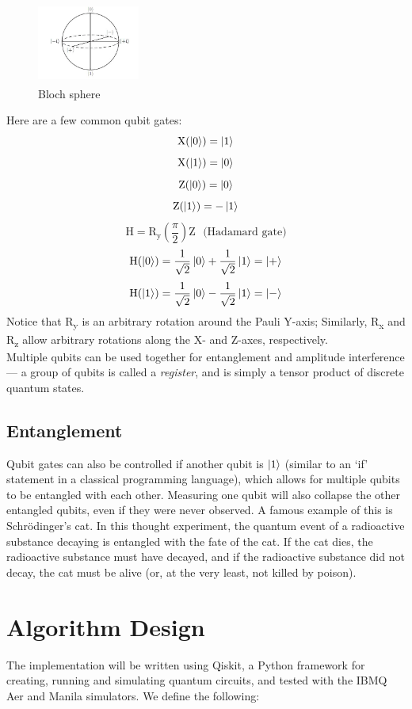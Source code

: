 \documentclass[12pt]{article}
\begin{document}
\begin{figure}[H]
    \centering
    \capstart
    \includegraphics[width=0.3\textwidth]{images/bloch_sphere.png}
    \caption{Bloch sphere\textsuperscript{\cite{wikipedia_2021}}}
    \label{fig:bsphere}
\end{figure}

\noindent Here are a few common qubit gates:
$$ \text{X}(\ket{0}) = \ket{1} $$
$$ \text{X}(\ket{1}) = \ket{0} $$
$$ \text{Z}(\ket{0}) = \ket{0} $$
$$ \text{Z}(\ket{1}) = -\ket{1} $$
$$ \text{H} = \text{R}_{\text{y}} \left(\frac{\pi}{2}\right) \text{Z} \ \ \ \text{(Hadamard gate)}$$
$$ \text{H}(\ket{0}) = \frac{1}{\sqrt{2}} \ket{0} + \frac{1}{\sqrt{2}} \ket{1} = \ket{+} $$
$$ \text{H}(\ket{1}) = \frac{1}{\sqrt{2}} \ket{0} - \frac{1}{\sqrt{2}} \ket{1} = \ket{-} $$
Notice that R\textsubscript{y} is an arbitrary rotation around the Pauli Y-axis; Similarly, R\textsubscript{x} and R\textsubscript{z} allow arbitrary rotations along the X- and Z-axes, respectively.\\
Multiple qubits can be used together for entanglement and amplitude interference --- a group of qubits is called a \textit{register}, and is simply a tensor product of discrete quantum states.

\subsection{Entanglement}
Qubit gates can also be controlled if another qubit is $\ket{1}$ (similar to an `if' statement in a classical programming language), which allows for multiple qubits to be entangled with each other. Measuring one qubit will also collapse the other entangled qubits, even if they were never observed. A famous example of this is Schr\"odinger's cat. In this thought experiment, the quantum event of a radioactive substance decaying is entangled with the fate of the cat. If the cat dies, the radioactive substance must have decayed, and if the radioactive substance did not decay, the cat must be alive (or, at the very least, not killed by poison).

\section{Algorithm Design}
The implementation will be written using Qiskit, a Python framework for creating, running and simulating quantum circuits, and tested with the IBMQ Aer and Manila simulators.
We define the following:
\end{document}
